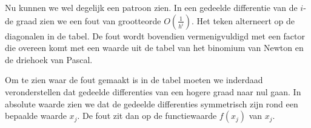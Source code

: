 \documentclass[examenvragen.tex]{subfiles}
\begin{document}
Nu kunnen we wel degelijk een patroon zien. In een gedeelde differentie van de $i$-de graad zien we een fout van grootteorde $O(\frac{1}{h^{i}})$. Het teken alterneert op de diagonalen in de tabel. De fout wordt bovendien vermenigvuldigd met een factor die overeen komt met een waarde uit de tabel van het binomium van Newton en de driehoek van Pascal.

Om te zien waar de fout gemaakt is in de tabel moeten we inderdaad veronderstellen dat gedeelde differenties van een hogere graad naar nul gaan. In absolute waarde zien we dat de gedeelde differenties symmetrisch zijn rond een bepaalde waarde $x_j$. De fout zit dan op de functiewaarde $f(x_{j})$ van $x_j$. 
\end{document}
